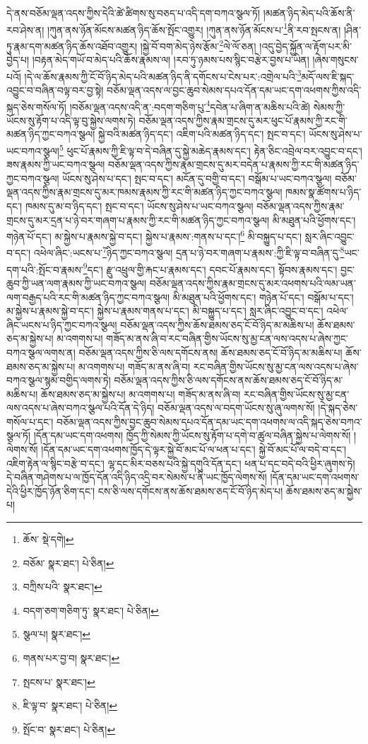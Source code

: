 དེ་ནས་བཅོམ་ལྡན་འདས་ཀྱིས་དེའི་ཚེ་ཚིགས་སུ་བཅད་པ་འདི་དག་བཀའ་སྩལ་ཏོ། །མཚན་ཉིད་མེད་པའི་ཆོས་ནི་རབ་ཤེས་ན། །ཀུན་ནས་ཉོན་མོངས་མཚན་ཉིད་ཆོས་སྤོང་འགྱུར། །ཀུན་ནས་ཉོན་མོངས་པ་\footnote{ཆོས་  སྡེ་དགེ། }ནི་རབ་སྤངས་ན། །ཤིན་ཏུ་རྣམ་དག་མཚན་ཉིད་ཆོས་འཐོབ་འགྱུར། །སྐྱེ་བོ་བག་མེད་ཉེས་རྩོམ་\footnote{བཅོམ་  སྣར་ཐང་།  པེ་ཅིན། }ལེ་ལོ་ཅན། །འདུ་བྱེད་སྐྱོན་ལ་རྟོག་པར་མི་བྱེད་པ། །བརྟན་མེད་གཡོ་བ་མེད་པའི་ཆོས་རྣམས་ལ། །རབ་ཏུ་ཉམས་པས་སྙིང་བརྩེར་བྱས་པ་ཡིན། །ཞེས་གསུངས་པའོ། །དེ་ལ་ཆོས་རྣམས་ཀྱི་ངོ་བོ་ཉིད་མེད་པའི་མཚན་ཉིད་ནི་དགོངས་པ་ངེས་པར་:འགྲེལ་པའི་\footnote{བཀྲིས་པའི་  སྣར་ཐང་། }མདོ་ལས་ཇི་སྐད་འབྱུང་བ་བཞིན་བལྟ་བར་བྱ་སྟེ། བཅོམ་ལྡན་འདས་ལ་བྱང་ཆུབ་སེམས་དཔའ་དོན་དམ་ཡང་དག་འཕགས་ཀྱིས་འདི་སྐད་ཅེས་གསོལ་ཏོ། །བཅོམ་ལྡན་འདས་འདི་ན་:བདག་གཅིག་པུ་\footnote{བདག་ཅག་གཅིག་ཏུ་  སྣར་ཐང་།  པེ་ཅིན། }དབེན་པ་ཞིག་ན་མཆིས་པའི་ཚེ། སེམས་ཀྱི་ཡོངས་སུ་རྟོག་པ་འདི་ལྟ་བུ་སྐྱེས་ལགས་ཏེ། བཅོམ་ལྡན་འདས་ཀྱིས་རྣམ་གྲངས་དུ་མར་ཕུང་པོ་རྣམས་ཀྱི་རང་གི་མཚན་ཉིད་ཀྱང་བཀའ་སྩལ། སྐྱེ་བའི་མཚན་ཉིད་དང་། འཇིག་པའི་མཚན་ཉིད་དང་། སྤང་བ་དང་། ཡོངས་སུ་ཤེས་པ་ཡང་བཀའ་སྩལ།\footnote{སྩལ་པ།  སྣར་ཐང་། } ཕུང་པོ་རྣམས་ཀྱི་ཇི་ལྟ་བ་དེ་བཞིན་དུ་སྐྱེ་མཆེད་རྣམས་དང་། རྟེན་ཅིང་འབྲེལ་བར་འབྱུང་བ་དང་། ཟས་རྣམས་ཀྱི་ཡང་བཀའ་སྩལ། བཅོམ་ལྡན་འདས་ཀྱིས་རྣམ་གྲངས་དུ་མར་བདེན་པ་རྣམས་ཀྱི་རང་གི་མཚན་ཉིད་ཀྱང་བཀའ་སྩལ། ཡོངས་སུ་ཤེས་པ་དང་། སྤང་བ་དང་། མངོན་དུ་བགྱི་བ་དང་། བསྒོམ་པ་ཡང་བཀའ་སྩལ། བཅོམ་ལྡན་འདས་ཀྱིས་རྣམ་གྲངས་དུ་མར་ཁམས་རྣམས་ཀྱི་རང་གི་མཚན་ཉིད་ཀྱང་བཀའ་སྩལ། ཁམས་སྣ་ཚོགས་པ་ཉིད་དང་། ཁམས་དུ་མ་བ་ཉིད་དང་། སྤང་བ་དང་། ཡོངས་སུ་ཤེས་པ་ཡང་བཀའ་སྩལ། བཅོམ་ལྡན་འདས་ཀྱིས་རྣམ་གྲངས་དུ་མར་དྲན་པ་ཉེ་བར་གཞག་པ་རྣམས་ཀྱི་རང་གི་མཚན་ཉིད་ཀྱང་བཀའ་སྩལ། མི་མཐུན་པའི་ཕྱོགས་དང་། གཉེན་པོ་དང་། མ་སྐྱེས་པ་རྣམས་སྐྱེ་བ་དང་། སྐྱེས་པ་རྣམས་:གནས་པ་དང་།\footnote{གནས་པར་བྱ་བ།  སྣར་ཐང་། } མི་བསྐྱུད་པ་དང་། སླར་ཞིང་འབྱུང་བ་དང་། འཕེལ་ཞིང་:ཡངས་པ་\footnote{སྤངས་པ་  སྣར་ཐང་། }ཉིད་ཀྱང་བཀའ་སྩལ། དྲན་པ་ཉེ་བར་གཞག་པ་རྣམས་:ཀྱི་ཇི་ལྟ་བ་བཞིན་དུ་\footnote{ཇི་ལྟ་བ་  སྣར་ཐང་།  པེ་ཅིན། }ཡང་དག་པའི་:སྤོང་བ་རྣམས་\footnote{སྤོང་བ་  སྣར་ཐང་།  པེ་ཅིན། }དང་། རྫུ་འཕྲུལ་གྱི་རྐང་པ་རྣམས་དང་། དབང་པོ་རྣམས་དང་། སྟོབས་རྣམས་དང་། བྱང་ཆུབ་ཀྱི་ཡན་ལག་རྣམས་ཀྱི་ཡང་བཀའ་སྩལ། བཅོམ་ལྡན་འདས་ཀྱིས་རྣམ་གྲངས་དུ་མར་འཕགས་པའི་ལམ་ཡན་ལག་བརྒྱད་པའི་རང་གི་མཚན་ཉིད་ཀྱང་བཀའ་སྩལ། མི་མཐུན་པའི་ཕྱོགས་དང་། གཉེན་པོ་དང་། བསྒོམ་པ་དང་། མ་སྐྱེས་པ་རྣམས་སྐྱེ་བ་དང་། སྐྱེས་པ་རྣམས་གནས་པ་དང་། མི་བསྐྱུད་པ་དང་། སླར་ཞིང་འབྱུང་བ་དང་། འཕེལ་ཞིང་ཡངས་པ་ཉིད་ཀྱང་བཀའ་སྩལ། བཅོམ་ལྡན་འདས་ཀྱིས་ཆོས་ཐམས་ཅད་ངོ་བོ་ཉིད་མ་མཆིས་པ། ཆོས་ཐམས་ཅད་མ་སྐྱེས་པ། མ་འགགས་པ། གཟོད་མ་ནས་ཞི་བ་རང་བཞིན་གྱིས་ཡོངས་སུ་མྱ་ངན་ལས་འདས་པ་ཞེས་ཀྱང་བཀའ་སྩལ་ལགས་ན། བཅོམ་ལྡན་འདས་ཀྱིས་ཅི་ལས་དགོངས་ནས། ཆོས་ཐམས་ཅད་ངོ་བོ་ཉིད་མ་མཆིས་པ། ཆོས་ཐམས་ཅད་མ་སྐྱེས་པ། མ་འགགས་པ། གཟོད་མ་ནས་ཞི་བ། རང་བཞིན་གྱིས་ཡོངས་སུ་མྱ་ངན་ལས་འདས་པ་ཞེས་བཀའ་སྩལ་སྙམ་བགྱིད་ལགས་ཏེ། བཅོམ་ལྡན་འདས་ཀྱིས་ཅི་ལས་དགོངས་ནས་ཆོས་ཐམས་ཅད་ངོ་བོ་ཉིད་མ་མཆིས་པ། ཆོས་ཐམས་ཅད་མ་སྐྱེས་པ། མ་འགགས་པ། གཟོད་མ་ནས་ཞི་བ། རང་བཞིན་གྱིས་ཡོངས་སུ་མྱ་ངན་ལས་འདས་པ་ཞེས་བཀའ་སྩལ་པའི་དོན་དེ་ཉིད། བཅོམ་ལྡན་འདས་ལ་བདག་ཡོངས་སུ་ཞུ་ལགས་སོ། །དེ་སྐད་ཅེས་གསོལ་པ་དང་། བཅོམ་ལྡན་འདས་ཀྱིས་བྱང་ཆུབ་སེམས་དཔའ་དོན་དམ་ཡང་དག་འཕགས་ལ་འདི་སྐད་ཅེས་བཀའ་སྩལ་ཏོ། །དོན་དམ་ཡང་དག་འཕགས། ཁྱོད་ཀྱི་སེམས་ཀྱི་ཡོངས་སུ་རྟོག་པ་དགེ་བ་ཚུལ་བཞིན་སྐྱེས་པ་ལེགས་སོ། །ལེགས་སོ། །དོན་དམ་ཡང་དག་འཕགས་ཁྱོད་དེ་ལྟར་སྐྱེ་བོ་མང་པོ་ལ་ཕན་པ་དང་། སྐྱེ་བོ་མང་པོ་ལ་བདེ་བ་དང་། འཇིག་རྟེན་ལ་སྙིང་བརྩེ་བ་དང་། ལྷ་དང་མིར་བཅས་པའི་སྐྱེ་དགུའི་དོན་དང་། ཕན་པ་དང་བདེ་བའི་ཕྱིར་ཞུགས་ཏེ། དེ་བཞིན་གཤེགས་པ་ལ་ཁྱོད་དོན་འདི་ཉིད་འདྲི་བར་སེམས་པ་ནི་ཡང་ཁྱོད་ལེགས་སོ། །དོན་དམ་ཡང་དག་འཕགས་དེའི་ཕྱིར་ཁྱོད་ཉོན་ཅིག་དང་། ངས་ཅི་ལས་དགོངས་ནས་ཆོས་ཐམས་ཅད་ངོ་བོ་ཉིད་མེད་པ། ཆོས་ཐམས་ཅད་མ་སྐྱེས་པ། 